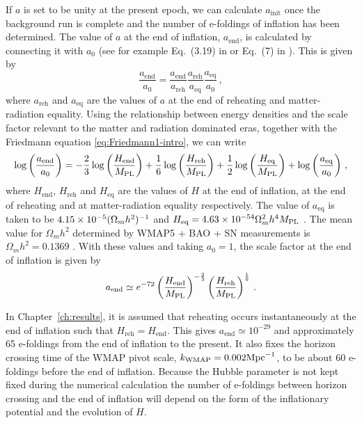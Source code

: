 If $a$ is set to be unity at the present epoch, we can calculate
$a_{\mathrm{init}}$ once the background run is complete and the number of e-foldings
of inflation has been determined.
The value of $a$ at the end of inflation, $a_\mathrm{end}$, is calculated by
connecting it with $a_0$ (see for example
Eq.~(3.19) in  or Eq.~(7) in ). 
This is given by
% 
\begin{equation}
 \label{eq:connection-num}
\frac{a_\mathrm{end}}{a_0} = \frac{a_\mathrm{end}}{a_\mathrm{reh}}
			     \frac{a_\mathrm{reh}}{a_\mathrm{eq}}
			     \frac{a_\mathrm{eq}}{a_\mathrm{0}}\,,
\end{equation}
% 
where $a_\mathrm{reh}$ and $a_\mathrm{eq}$ are the values of $a$ at the end of
reheating and matter-radiation equality. Using the relationship between energy
densities and the scale factor relevant to the matter and radiation dominated
eras, together with the Friedmann
equation \eqref{eq:Friedmann1-intro}, we can write
% 
\begin{equation}
 \label{eq:conn2-num}
\log\left(\frac{a_\mathrm{end}}{a_0}\right) =
 -\frac{2}{3}\log\left(\frac{H_\mathrm{end}}{M_{\mathrm{PL}}}\right)
 + \frac{1}{6}\log\left(\frac{H_\mathrm{reh}}{M_{\mathrm{PL}}}\right)
 + \frac{1}{2}\log\left(\frac{H_\mathrm{eq}}{M_{\mathrm{PL}}}\right)
 + \log\left(\frac{a_\mathrm{eq}}{a_0}\right)\,,
\end{equation}
% 
where $H_\mathrm{end}$, $H_\mathrm{reh}$ and $H_\mathrm{eq}$ are the values of $H$
at the end of inflation, at the end of reheating and at matter-radiation equality
respectively.
The value
of $a_\mathrm{eq}$ is taken to be $4.15\times 10^{-5} (\Omega_m h^2)^{-1}$ and
$H_\mathrm{eq}=4.63\times 10^{-54} \Omega_m^2 h^4 M_{\mathrm{PL}}$ \cite{Peiris:2008be, book:dodelson}.
The mean value for $\Omega_m h^2$ determined by WMAP5 + BAO + SN measurements is
$\Omega_m h^2 =0.1369$ \cite{Komatsu:2008hk}. With these values and taking
$a_0=1$, the scale factor at the end of inflation is given by
% 
\begin{equation}
\label{eq:aend-num}
a_\mathrm{end} \simeq e^{-72}
\left(\frac{H_\mathrm{end}}{M_{\mathrm{PL}}}\right)^{-\frac{2}{3}} 
\left(\frac{H_\mathrm{reh}}{M_{\mathrm{PL}}}\right)^{\frac{1}{6}}\,.
\end{equation}
% 


In Chapter~\ref{ch:results}, it is assumed that
reheating occurs instantaneously at the end of
inflation such that $H_\mathrm{reh} = H_\mathrm{end}$. This gives
$a_\mathrm{end} \simeq 10^{-29}$ and approximately 65
e-foldings from the end of inflation to the present. It also fixes the horizon
crossing
time of the WMAP pivot scale, $k_\mathrm{WMAP}=0.002\mathrm{Mpc}^{-1}$, to be about 60 e-foldings
before
the end of inflation. Because the Hubble parameter is not kept fixed during the
numerical calculation the
number of e-foldings between horizon crossing and the end of inflation will depend
on the form of the inflationary potential and the evolution of $H$. 


